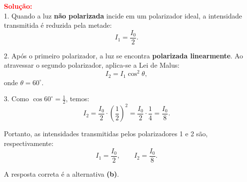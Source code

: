 \begin{flushleft}
\textcolor{red}{\textbf{Solução:}}\\

1. Quando a luz \textbf{n\~ao polarizada} incide em um polarizador ideal, a intensidade transmitida é reduzida pela metade:
\[
I_1 = \frac{I_0}{2}.
\]

2. Ap\'os o primeiro polarizador, a luz se encontra \textbf{polarizada linearmente}. Ao atravessar o segundo polarizador, aplica-se a Lei de Malus:
\[
I_2 = I_1 \cos^2\theta,
\]
onde \(\theta=60^\circ\).

3. Como \(\cos 60^\circ = \tfrac{1}{2}\), temos:
\[
I_2 = \frac{I_0}{2} \cdot \left(\frac{1}{2}\right)^2 
= \frac{I_0}{2} \cdot \frac{1}{4} 
= \frac{I_0}{8}.
\]

Portanto, as intensidades transmitidas pelos polarizadores 1 e 2 são, respectivamente:
\[
I_1 = \frac{I_0}{2}, 
\qquad 
I_2 = \frac{I_0}{8}.
\]

\vspace{0.3cm}

A resposta correta é a alternativa \colorbox{green!50}{\textbf{(b)}}.

\end{flushleft}

%
%
%
%
%
%
%

